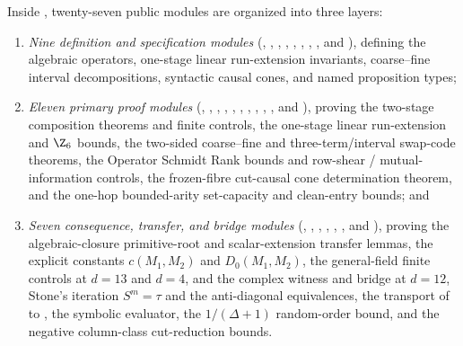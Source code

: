 Inside , twenty-seven public modules are organized into three layers:
\begin{enumerate}[label=(\arabic*)]
\item \emph{Nine definition and specification modules}
  (,
  ,
  ,
  ,
  ,
  ,
  ,
  , and
  ), defining the algebraic operators, one-stage linear
  run-extension invariants, coarse--fine interval decompositions, syntactic causal cones, and named
  proposition types;
\item \emph{Eleven primary proof modules}
  (,
  ,
  ,
  ,
  ,
  ,
  ,
  ,
  ,
  , and
  ), proving the two-stage composition theorems and
  finite controls, the one-stage linear run-extension and $\Z_6$ bounds, the two-sided coarse--fine
  and three-term/interval swap-code theorems, the Operator Schmidt Rank bounds and row-shear /
  mutual-information controls, the frozen-fibre cut-causal cone determination theorem, and the
  one-hop bounded-arity set-capacity and clean-entry bounds; and
\item \emph{Seven consequence, transfer, and bridge modules}
  (,
  ,
  ,
  ,
  ,
  , and
  ), proving the algebraic-closure primitive-root and
  scalar-extension transfer lemmas, the explicit constants $c(M_1, M_2)$ and
  $D_0(M_1, M_2)$, the general-field finite controls at $d = 13$ and $d = 4$, and the complex
  witness and bridge at $d = 12$, Stone's
  iteration $S^m = \tau$ and the  anti-diagonal equivalences, the transport
  of  to , the symbolic
   evaluator, the $1/(\Delta+1)$ random-order bound, and the negative
  column-class cut-reduction bounds.
\end{enumerate}

